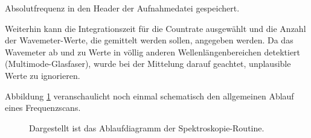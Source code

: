 Absolutfrequenz in den Header der Aufnahmedatei gespeichert.\par
Weiterhin kann die Integrationszeit für die Countrate ausgewählt und die Anzahl
der Wavemeter-Werte, die gemittelt werden sollen, angegeben werden. Da das
Wavemeter ab und zu Werte in völlig anderen Wellenlängenbereichen detektiert
(Multimode-Glasfaser), wurde bei der Mittelung darauf geachtet,
unplausible Werte zu ignorieren.\par
Abbildung \ref{fig:spektroskopie_ablaufdiagramm} veranschaulicht noch einmal
schematisch den allgemeinen Ablauf eines Frequenzscans.
\begin{figure}[hp]
 	\centering
	\caption[Spektroskopie -
	Software-Ablaufdiagramm]{Dargestellt ist das Ablaufdiagramm der
	Spektroskopie-Routine.}\label{fig:spektroskopie_ablaufdiagramm}
\end{figure}
